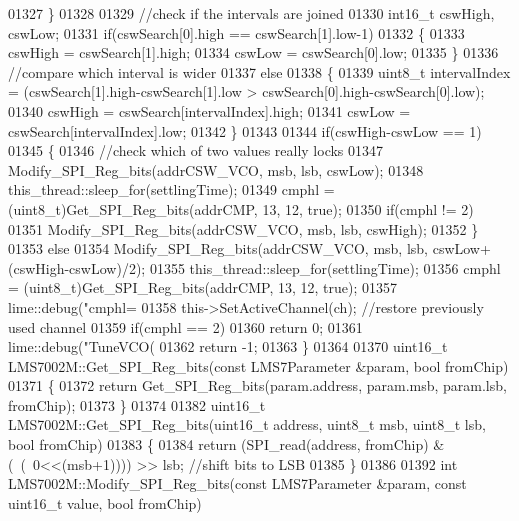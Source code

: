 \begin{DoxyCode}
{{{{{{{{{{{{{{{{{{{{{{{{{{{{{{{{{{{{{{{{01327     \}
01328 
01329     \textcolor{comment}{//check if the intervals are joined}
01330     int16\_t cswHigh, cswLow;
01331     \textcolor{keywordflow}{if}(cswSearch[0].high == cswSearch[1].low-1)
01332     \{
01333         cswHigh = cswSearch[1].high;
01334         cswLow = cswSearch[0].low;
01335     \}
01336     \textcolor{comment}{//compare which interval is wider}
01337         \textcolor{keywordflow}{else}
01338     \{
01339         uint8\_t intervalIndex = (cswSearch[1].high-cswSearch[1].low > cswSearch[0].high-cswSearch[0].low);
01340         cswHigh = cswSearch[intervalIndex].high;
01341         cswLow = cswSearch[intervalIndex].low;
01342     \}
01343 
01344     \textcolor{keywordflow}{if}(cswHigh-cswLow == 1)
01345     \{
01346         \textcolor{comment}{//check which of two values really locks}
01347         Modify_SPI_Reg_bits(addrCSW\_VCO, msb, lsb, cswLow);
01348         this\_thread::sleep\_for(settlingTime);
01349         cmphl = (uint8\_t)Get_SPI_Reg_bits(addrCMP, 13, 12, \textcolor{keyword}{true});
01350         \textcolor{keywordflow}{if}(cmphl != 2)
01351             Modify_SPI_Reg_bits(addrCSW\_VCO, msb, lsb, cswHigh);
01352     \}
01353     \textcolor{keywordflow}{else}
01354         Modify_SPI_Reg_bits(addrCSW\_VCO, msb, lsb, cswLow+(cswHigh-cswLow)/2);
01355     this\_thread::sleep\_for(settlingTime);
01356     cmphl = (uint8\_t)Get_SPI_Reg_bits(addrCMP, 13, 12, \textcolor{keyword}{true});
01357     lime::debug(\textcolor{stringliteral}{"cmphl=%
01358     this->SetActiveChannel(ch); \textcolor{comment}{//restore previously used channel}
01359     \textcolor{keywordflow}{if}(cmphl == 2)
01360         \textcolor{keywordflow}{return} 0;
01361     lime::debug(\textcolor{stringliteral}{"TuneVCO(%
01362     \textcolor{keywordflow}{return} -1;
01363 \}
01364 
01370 uint16\_t LMS7002M::Get_SPI_Reg_bits(\textcolor{keyword}{const} LMS7Parameter &param, \textcolor{keywordtype}{bool} fromChip)
01371 \{
01372     \textcolor{keywordflow}{return} Get_SPI_Reg_bits(param.address, param.msb, param.lsb, fromChip);
01373 \}
01374 
01382 uint16\_t LMS7002M::Get_SPI_Reg_bits(uint16\_t address, uint8\_t msb, uint8\_t lsb, \textcolor{keywordtype}{bool} fromChip)
01383 \{
01384     \textcolor{keywordflow}{return} (SPI_read(address, fromChip) & (~(~0<<(msb+1)))) >> lsb; \textcolor{comment}{//shift bits to LSB}
01385 \}
01386 
01392 \textcolor{keywordtype}{int} LMS7002M::Modify_SPI_Reg_bits(\textcolor{keyword}{const} LMS7Parameter &param, \textcolor{keyword}{const} uint16\_t value, \textcolor{keywordtype}{bool} fromChip)
}}}}}}}}}}}}}}}}}}}}}}}}}}}}}}}}}}}}}}}}}}
\end{DoxyCode}
